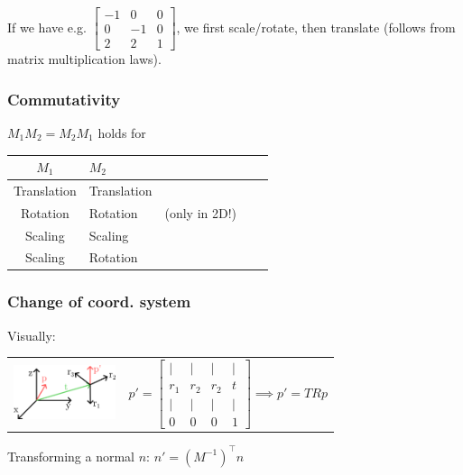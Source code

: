 \documentclass[a4paper,10pt]{article}
\renewcommand*{\arraystretch}{2}
\begin{document}
\egroup
If we have e.g. \(  \left[\begin{smallmatrix} -1 & 0 & 0 \\ 0 & -1 & 0 \\ 2 & 2 & 1 \end{smallmatrix}\right] \), we first scale/rotate, then translate (follows from matrix multiplication laws).

\subsubsection{Commutativity}
\( M_1 M_{2} = M_{2} M_{1} \) holds for
\begin{center}
    {\renewcommand{\arraystretch}{1.2}
    \begin{tabularx}{\linewidth}{c>{\centering\arraybackslash}Xc>{\centering\arraybackslash}Xc}
	\toprule
	\( M_{1} \) & \( M_{2} \) & \\
	\midrule
	Translation & Translation & \\
	Rotation & Rotation & (only in 2D!) \\
	Scaling & Scaling &\\
	Scaling & Rotation & \\
	\bottomrule
    \end{tabularx}
    }
\end{center}

\subsubsection{Change of coord. system} Visually:

\begin{tabular}{m{3cm}r}
    \includegraphics[width=3cm]{coord-system-change.png}
&
$
 p' = \left[\begin{smallmatrix} | & | & | & | \\ r_1 & r_2 & r_2 & t \\ | & | & | & | \\ 0 & 0 & 0 & 1 \end{smallmatrix}\right] \implies p' = TRp
$
\\
\end{tabular}

Transforming a normal \( n \): \( n' = (M^{-1})^\top n \)
\end{document}
